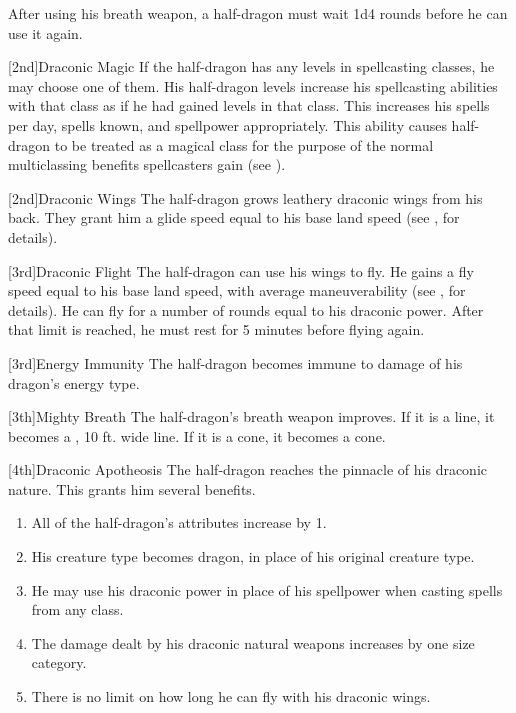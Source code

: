             After using his breath weapon, a half-dragon must wait 1d4 rounds before he can use it again.

            [2nd]{Draconic Magic} If the half-dragon has any levels in spellcasting classes, he may choose one of them.
            His half-dragon levels increase his spellcasting abilities with that class as if he had gained levels in that class.
            This increases his spells per day, spells known, and spellpower appropriately.
            This ability causes half-dragon to be treated as a magical class for the purpose of the normal multiclassing benefits spellcasters gain (see ).

            [2nd]{Draconic Wings}
            The half-dragon grows leathery draconic wings from his back.
            They grant him a glide speed equal to his base land speed (see , for details).

            [3rd]{Draconic Flight}
            The half-dragon can use his wings to fly.
            He gains a fly speed equal to his base land speed, with average maneuverability (see , for details).
            He can fly for a number of rounds equal to his draconic power.
            After that limit is reached, he must rest for 5 minutes before flying again.

            [3rd]{Energy Immunity} The half-dragon becomes immune to damage of his dragon's energy type.

            [3th]{Mighty Breath}
            The half-dragon's breath weapon improves.
            If it is a line, it becomes a \areahuge, 10 ft. wide line.
            If it is a cone, it becomes a \arealarge cone.

            [4th]{Draconic Apotheosis}
            The half-dragon reaches the pinnacle of his draconic nature.
            This grants him several benefits.
            \begin{enumerate}
                \item All of the half-dragon's attributes increase by 1.
                \item His creature type becomes dragon, in place of his original creature type.
                \item He may use his draconic power in place of his spellpower when casting spells from any class.
                \item The damage dealt by his draconic natural weapons increases by one size category.
                \item There is no limit on how long he can fly with his draconic wings.
            \end{enumerate}

